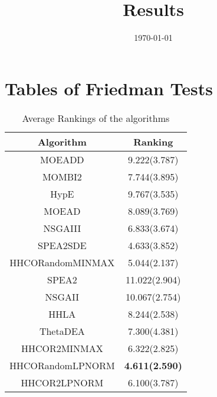 \documentclass{article}
\title{Results}
\author{}
\date{\today}
\begin{document}
\oddsidemargin 0in \topmargin 0in\maketitle
\section{Tables of Friedman Tests}
\begin{table}[!htp]
\centering
\caption{Average Rankings of the algorithms
}\begin{tabular}{|c|c|}
\hline
Algorithm&Ranking\\
\hline
MOEADD&9.222(3.787)\\\hline
MOMBI2&7.744(3.895)\\\hline
HypE&9.767(3.535)\\\hline
MOEAD&8.089(3.769)\\\hline
NSGAIII&6.833(3.674)\\\hline
SPEA2SDE&4.633(3.852)\\\hline
HHCORandomMINMAX&5.044(2.137)\\\hline
SPEA2&11.022(2.904)\\\hline
NSGAII&10.067(2.754)\\\hline
HHLA&8.244(2.538)\\\hline
ThetaDEA&7.300(4.381)\\\hline
HHCOR2MINMAX&6.322(2.825)\\\hline
HHCORandomLPNORM& {\bf 4.611(2.590)}\\\hline
HHCOR2LPNORM&6.100(3.787)\\\hline
\end{tabular}
\end{table}
\end{document}

